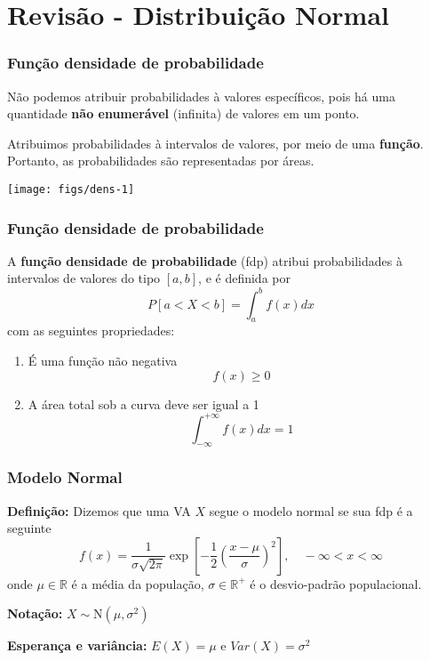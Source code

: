 \documentclass[11pt]{beamer}
\begin{document}
\section{Revisão - Distribuição Normal}
\begin{frame}
\frametitle{Função densidade de probabilidade}

Não podemos atribuir probabilidades à valores específicos, pois há uma
quantidade \textbf{não enumerável} (infinita) de valores em um ponto.

Atribuimos probabilidades à intervalos de valores, por meio de uma
\textbf{função}. Portanto, as probabilidades são representadas por
áreas.


\begin{center}\texttt{[image: figs/dens-1]} \end{center}
\end{frame}

\begin{frame}
\frametitle{Função densidade de probabilidade}

A \textbf{função densidade de probabilidade} (fdp) atribui
probabilidades à intervalos de valores do tipo \([a,b]\), e é definida
por \[
P[a < X < b] = \int_{a}^{b} f(x) dx
\] com as seguintes propriedades:

\begin{enumerate}
\def\labelenumi{\roman{enumi}.}
\item
  É uma função não negativa \[f(x) \geq 0\]
\item
  A área total sob a curva deve ser igual a 1
  \[\int_{-\infty}^{+\infty} f(x) dx = 1\]
\end{enumerate}
\end{frame}

\begin{frame}
\frametitle{Modelo Normal}

\textbf{Definição:} Dizemos que uma VA \(X\) segue o modelo normal se
sua fdp é a seguinte \[
f(x) = \frac{1}{\sigma\sqrt{2\pi}} \exp\left[-\frac{1}{2} \left( \frac{x -
\mu}{\sigma}\right)^2\right], \quad -\infty < x < \infty
\] onde \(\mu \in \mathbb{R}\) é a média da população,
\(\sigma \in \mathbb{R}^+\) é o desvio-padrão populacional.

\textbf{Notação:} \(X \sim \text{N}(\mu, \sigma^2)\)

\textbf{Esperança e variância:} \(E(X) = \mu\) e \(Var(X) = \sigma^2\)
\end{frame}
\end{document}

